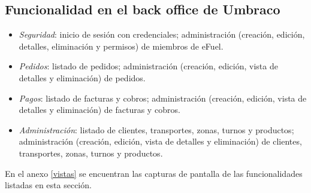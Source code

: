 \subsection{Funcionalidad en el back office de Umbraco}
\begin{itemize}
    \item \emph{Seguridad}: inicio de sesión con credenciales; administración (creación, edición, detalles, eliminación y permisos) de miembros de eFuel.
    
    \item \emph{Pedidos}: listado de pedidos; administración (creación, edición, vista de detalles y eliminación) de pedidos.
    
    \item \emph{Pagos}: listado de facturas y cobros; administración (creación, edición, vista de detalles y eliminación) de facturas y cobros.
    
    \item \emph{Administración}: listado de clientes, transportes, zonas, turnos y productos; administración (creación, edición, vista de detalles y eliminación) de clientes, transportes, zonas, turnos y productos.
\end{itemize}

En el anexo \ref{vistas} se encuentran las capturas de pantalla de las funcionalidades listadas en esta sección.